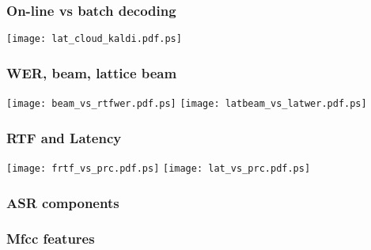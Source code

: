 \begin{frame}\frametitle{On-line vs batch decoding} 
    \texttt{[image: lat\_cloud\_kaldi.pdf.ps]}
\end{frame}


\begin{frame}\frametitle{WER, beam, lattice beam} 
    \texttt{[image: beam\_vs\_rtfwer.pdf.ps]}
    \texttt{[image: latbeam\_vs\_latwer.pdf.ps]}
\end{frame}

\begin{frame}\frametitle{RTF and Latency} 
    \texttt{[image: frtf\_vs\_prc.pdf.ps]}
    \texttt{[image: lat\_vs\_prc.pdf.ps]}
\end{frame}

\begin{frame}\frametitle{ASR components} 
    
\end{frame}

\begin{frame}\frametitle{Mfcc features} 
    
    
\end{frame}


